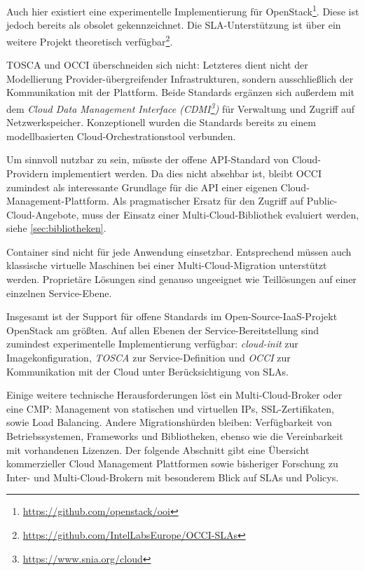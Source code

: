 \begin{description}
	Auch hier existiert eine experimentelle Implementierung für OpenStack\footnote{\url{https://github.com/openstack/ooi}}. Diese ist jedoch bereits als obsolet gekennzeichnet. Die SLA-Unterstützung ist über ein weitere Projekt theoretisch verfügbar\footnote{\url{https://github.com/IntelLabsEurope/OCCI-SLAs}}.
	
	TOSCA und OCCI überschneiden sich nicht: Letzteres dient nicht der Modellierung Provider-übergreifender Infrastrukturen, sondern ausschließlich der Kommunikation mit der Plattform. Beide Standards ergänzen sich außerdem mit dem \emph{Cloud Data Management Interface (CDMI\footnote{\url{https://www.snia.org/cloud}})} für Verwaltung und Zugriff auf Netzwerkspeicher. Konzeptionell wurden die Standards bereits zu einem modellbasierten Cloud-Orchestrationstool verbunden.
	
	Um sinnvoll nutzbar zu sein, müsste der offene API-Standard von Cloud-Providern implementiert werden. Da dies nicht absehbar ist, bleibt OCCI zumindest als interessante Grundlage für die API einer eigenen Cloud-Management-Plattform. Als pragmatischer Ersatz für den Zugriff auf Public-Cloud-Angebote, muss der Einsatz einer Multi-Cloud-Bibliothek evaluiert werden, siehe \autoref{sec:bibliotheken}.		
	
\end{description}

\noindent
Container sind nicht für jede Anwendung einsetzbar. Entsprechend müssen auch klassische virtuelle Maschinen bei einer Multi-Cloud-Migration unterstützt werden. Proprietäre Lösungen sind genauso ungeeignet wie Teillösungen auf einer einzelnen Service-Ebene.

Insgesamt ist der Support für offene Standards im Open-Source-IaaS-Projekt OpenStack am größten. Auf allen Ebenen der Service-Bereitstellung sind zumindest experimentelle Implementierung verfügbar: \emph{cloud-init} zur Imagekonfiguration, \emph{TOSCA} zur Service-Definition und \emph{OCCI} zur Kommunikation mit der Cloud unter Berücksichtigung von SLAs. 

Einige weitere technische Herausforderungen löst ein Multi-Cloud-Broker oder eine CMP: Management von statischen und virtuellen IPs, SSL-Zertifikaten, sowie Load Balancing. Andere Migrationshürden bleiben: Verfügbarkeit von Betriebssystemen, Frameworks und Bibliotheken, ebenso wie die Vereinbarkeit mit vorhandenen Lizenzen. Der folgende Abschnitt gibt eine Übersicht kommerzieller Cloud Management Plattformen sowie bisheriger Forschung zu Inter- und Multi-Cloud-Brokern mit besonderem Blick auf SLAs und Policys. 

